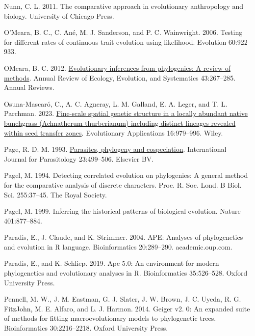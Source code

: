 \documentclass[fleqn,10pt,lineno]{wlpeerj} %
\newlength{\cslhangindent}
\newlength{\cslentryspacingunit} %
\newenvironment{CSLReferences}[2] %
 {%
  \setlength{\parindent}{0pt}
  \ifodd #1
  \let\oldpar\par
  \def\par{\hangindent=\cslhangindent\oldpar}
  \fi
  \setlength{\parskip}{#2\cslentryspacingunit}
 }%
 {}
\begin{document}
\begin{CSLReferences}{1}{0}
\leavevmode{}%
Nunn, C. L. 2011. The comparative approach in evolutionary anthropology and biology. University of Chicago Press.

\leavevmode{}%
O'Meara, B. C., C. Ané, M. J. Sanderson, and P. C. Wainwright. 2006. Testing for different rates of continuous trait evolution using likelihood. Evolution 60:922--933.

\leavevmode{}%
OMeara, B. C. 2012. \href{https://doi.org/10.1146/annurev-ecolsys-110411-160331}{Evolutionary inferences from phylogenies: A review of methods}. Annual Review of Ecology, Evolution, and Systematics 43:267--285. Annual Reviews.

\leavevmode{}%
Osuna-Mascaró, C., A. C. Agneray, L. M. Galland, E. A. Leger, and T. L. Parchman. 2023. \href{https://doi.org/10.1111/eva.13547}{Fine-scale spatial genetic structure in a locally abundant native bunchgrass ({Achnatherum thurberianum}) including distinct lineages revealed within seed transfer zones}. Evolutionary Applications 16:979--996. Wiley.

\leavevmode{}%
Page, R. D. M. 1993. \href{https://doi.org/10.1016/0020-7519(93)90039-2}{Parasites, phylogeny and cospeciation}. International Journal for Parasitology 23:499--506. Elsevier {BV}.

\leavevmode{}%
Pagel, M. 1994. Detecting correlated evolution on phylogenies: A general method for the comparative analysis of discrete characters. Proc. R. Soc. Lond. B Biol. Sci. 255:37--45. The Royal Society.

\leavevmode{}%
Pagel, M. 1999. Inferring the historical patterns of biological evolution. Nature 401:877--884.

\leavevmode{}%
Paradis, E., J. Claude, and K. Strimmer. 2004. {APE}: Analyses of phylogenetics and evolution in {R} language. Bioinformatics 20:289--290. academic.oup.com.

\leavevmode{}%
Paradis, E., and K. Schliep. 2019. Ape 5.0: An environment for modern phylogenetics and evolutionary analyses in {R}. Bioinformatics 35:526--528. Oxford University Press.

\leavevmode{}%
Pennell, M. W., J. M. Eastman, G. J. Slater, J. W. Brown, J. C. Uyeda, R. G. FitzJohn, M. E. Alfaro, and L. J. Harmon. 2014. Geiger v2. 0: An expanded suite of methods for fitting macroevolutionary models to phylogenetic trees. Bioinformatics 30:2216--2218. Oxford University Press.


\end{CSLReferences}
\end{document}
